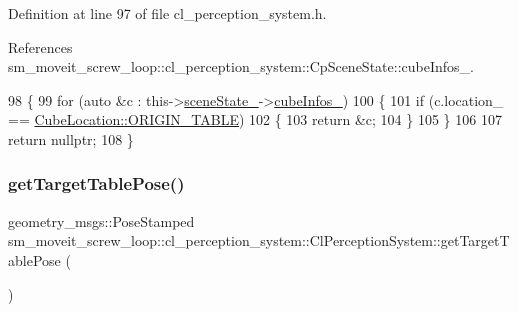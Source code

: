 Definition at line 97 of file cl\+\_\+perception\+\_\+system.\+h.



References sm\+\_\+moveit\+\_\+screw\+\_\+loop\+::cl\+\_\+perception\+\_\+system\+::\+Cp\+Scene\+State\+::cube\+Infos\+\_\+.


\begin{DoxyCode}
98             \{
99                 \textcolor{keywordflow}{for} (\textcolor{keyword}{auto} &c : this->\hyperlink{classsm__moveit__screw__loop_1_1cl__perception__system_1_1ClPerceptionSystem_abb08b3cc6d4ec414a608da92133b1f66}{sceneState\_}->\hyperlink{classsm__moveit__screw__loop_1_1cl__perception__system_1_1CpSceneState_afef6eaf7eb94cf74b9333a373b2fb35d}{cubeInfos\_})
100                 \{
101                     \textcolor{keywordflow}{if} (c.location\_ == \hyperlink{namespacesm__moveit__screw__loop_1_1cl__perception__system_a3685ee11048648ccb59214d2341fb8caae5ee34c3ef8ec4a46a00a218416c7b1d}{CubeLocation::ORIGIN\_TABLE})
102                     \{
103                         \textcolor{keywordflow}{return} &c;
104                     \}
105                 \}
106 
107                 \textcolor{keywordflow}{return} \textcolor{keyword}{nullptr};
108             \}
\end{DoxyCode}
\mbox{\label{classsm__moveit__screw__loop_1_1cl__perception__system_1_1ClPerceptionSystem_aaef94ec7b4e2e9249829d4b24ad2499e}} 
\subsubsection{\texorpdfstring{get\+Target\+Table\+Pose()}{getTargetTablePose()}}
{\footnotesize\ttfamily geometry\+\_\+msgs\+::\+Pose\+Stamped sm\+\_\+moveit\+\_\+screw\+\_\+loop\+::cl\+\_\+perception\+\_\+system\+::\+Cl\+Perception\+System\+::get\+Target\+Table\+Pose (\begin{DoxyParamCaption}{ }\end{DoxyParamCaption})\hspace{0.3cm}{\ttfamily [inline]}}



